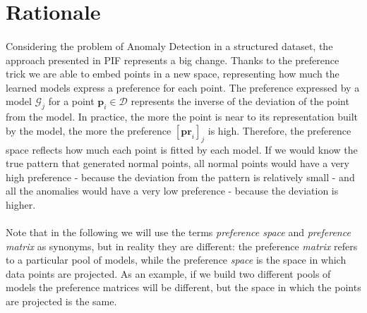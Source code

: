 \section{Rationale}

\paragraph{}
Considering the problem of Anomaly Detection in a structured dataset, the approach presented in PIF represents a big change. Thanks to the preference trick we are able to embed points in a new space, representing how much the learned models express a preference for each point. \newline
The preference expressed by a model $\mathcal{G}_j$ for a point $\textbf{p}_i \in \mathcal{D}$ represents the inverse of the deviation of the point from the model. In practice, the more the point is near to its representation built by the model, the more the preference $[\textbf{pr}_i]_j$ is high. Therefore, the preference space reflects how much each point is fitted by each model. \newline
If we would know the true pattern that generated normal points, all normal points would have a very high preference - because the deviation from the pattern is relatively small - and all the anomalies would have a very low preference - because the deviation is higher.

\paragraph{}
Note that in the following we will use the terms \textit{preference space} and \textit{preference matrix} as synonyms, but in reality they are different: the preference \textit{matrix} refers to a particular pool of models, while the preference \textit{space} is the space in which data points are projected. As an example, if we build two different pools of models the preference matrices will be different, but the space in which the points are projected is the same.

